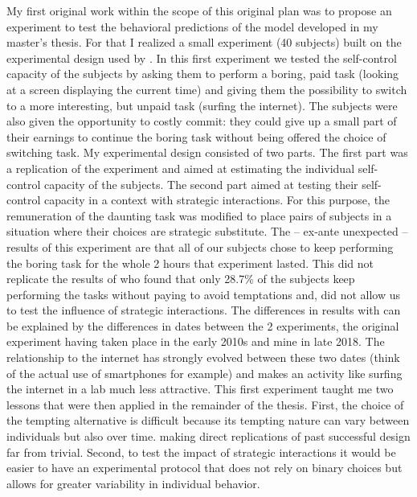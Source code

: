 \documentclass[
]{book}
\begin{document}
My first original work within the scope of this original plan was to propose an experiment to test the
behavioral predictions of the model developed in my master's thesis.
For that I realized a small experiment (40 subjects) built on the experimental design used by \citet{houser2018temptation}.
In this first experiment we tested the self-control capacity of the subjects by asking
them to perform a boring, paid task (looking at a screen displaying the current time) and giving them the possibility to switch to a more interesting, but unpaid task (surfing the
internet).
The subjects were also given the opportunity to costly commit: they could give up a small part of their earnings to continue the boring task without being offered the choice of switching task.
My experimental design consisted of two parts.
The first part was a replication of the \citet{houser2018temptation} experiment and aimed at estimating the individual self-control capacity of the subjects.
The second part aimed at testing their self-control capacity in a context with strategic interactions.
For this purpose, the remuneration of the daunting task was modified to place
pairs of subjects in a situation where their choices are strategic substitute.
The -- ex-ante unexpected -- results of this experiment are that all of our
subjects chose to keep performing the
boring task for the whole 2 hours that experiment lasted.
This did not replicate the results of \citet{houser2018temptation} who found that only
28.7\% of the subjects keep performing the tasks without paying to avoid
temptations and, did not allow us to test the influence of strategic
interactions.
The differences in results with \citet{houser2018temptation} can be explained by the
differences in dates between the 2 experiments, the original experiment having
taken place in the early 2010s and mine in late 2018.
The relationship to the internet has strongly evolved between these two dates
(think of the actual use of smartphones for example)
and makes an activity like surfing the internet in a lab much less attractive.
This first experiment taught me two lessons that were then applied in the
remainder of the thesis.
First, the choice of the
tempting alternative is difficult because its tempting nature can vary between
individuals but also over time.
making direct replications of past successful design far from trivial.
Second, to test the impact of strategic interactions it would be easier to have
an experimental protocol that does not rely on binary choices but allows for
greater variability in individual behavior.
\end{document}
